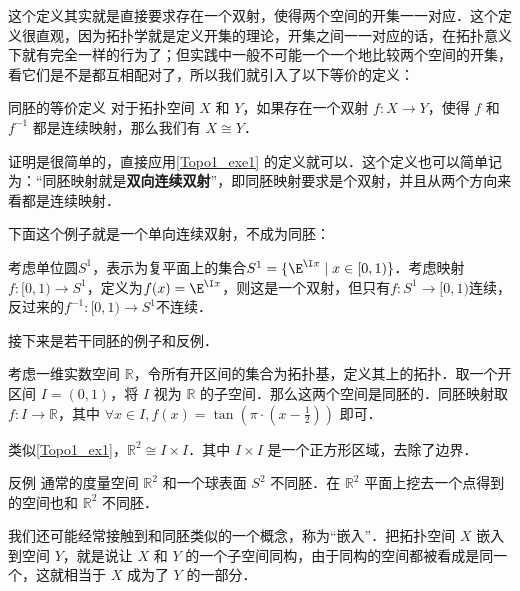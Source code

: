 这个定义其实就是直接要求存在一个双射，使得两个空间的开集一一对应．这个定义很直观，因为拓扑学就是定义开集的理论，开集之间一一对应的话，在拓扑意义下就有完全一样的行为了；但实践中一般不可能一个一个地比较两个空间的开集，看它们是不是都互相配对了，所以我们就引入了以下等价的定义：

\begin{theorem}{同胚的等价定义}\label{Topo1_the1}
对于拓扑空间 $X$ 和 $Y$，如果存在一个双射 $f:X\rightarrow Y$，使得 $f$ 和 $f^{-1}$ 都是连续映射，那么我们有 $X\cong Y$．
\end{theorem}

证明是很简单的，直接应用\autoref{Topo1_exe1} 的定义就可以．这个定义也可以简单记为：“同胚映射就是\textbf{双向连续双射}”，即同胚映射要求是个双射，并且从两个方向来看都是连续映射．

下面这个例子就是一个单向连续双射，不成为同胚：

\begin{example}{}

考虑单位圆$S^1$，表示为复平面上的集合$S^1=\{\E^{\I x}\mid x\in[0, 1)\}$．考虑映射$f:[0, 1)\to S^1$，定义为$f(x)=\E^{\I x}$，则这是一个双射，但只有$f:S^1\to[0, 1)$连续，反过来的$f^{-1}:[0, 1)\to S^1$不连续．

\end{example}

接下来是若干同胚的例子和反例．

\begin{example}{}\label{Topo1_ex1}
考虑一维实数空间 $\mathbb{R}$，令所有开区间的集合为拓扑基，定义其上的拓扑．取一个开区间 $I=(0, 1)$，将 $I$ 视为 $\mathbb{R}$ 的子空间．那么这两个空间是同胚的．同胚映射取 $f:I\rightarrow\mathbb{R}$，其中 $\forall x\in I, f(x)=\tan{(\pi\cdot(x-\frac{1}{2}))}$ 即可．
\end{example}

\begin{example}{}\label{Topo1_ex2}
类似\autoref{Topo1_ex1}，$\mathbb{R}^2\cong I\times I$．其中 $I\times I$ 是一个正方形区域，去除了边界．
\end{example}

\begin{example}{反例}\label{Topo1_ex3}
通常的度量空间 $\mathbb{R}^2$ 和一个球表面 $S^2$ 不同胚．在 $\mathbb{R}^2$ 平面上挖去一个点得到的空间也和 $\mathbb{R}^2$ 不同胚．
\end{example}

我们还可能经常接触到和同胚类似的一个概念，称为“嵌入”．把拓扑空间 $X$ 嵌入到空间 $Y$，就是说让 $X$ 和 $Y$ 的一个子空间同构，由于同构的空间都被看成是同一个，这就相当于 $X$ 成为了 $Y$ 的一部分．

